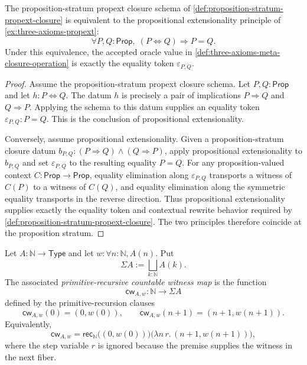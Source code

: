 \begin{theorem}
\label{thm:propext-proposition-stratum-meta-closure}
The proposition-stratum propext closure schema of \autoref{def:proposition-stratum-propext-closure} is equivalent to the propositional extensionality principle of \autoref{ex:three-axioms-propext}:
$$
\forall P,Q:\mathsf{Prop},\; (P\Leftrightarrow Q)\Rightarrow P=Q.
$$
Under this equivalence, the accepted oracle value in \autoref{def:three-axioms-meta-closure-operation} is exactly the equality token $\varepsilon_{P,Q}$.
\end{theorem}

\begin{proof}
Assume the proposition-stratum propext closure schema. Let $P,Q:\mathsf{Prop}$ and let $h:P\Leftrightarrow Q$. The datum $h$ is precisely a pair of implications $P\Rightarrow Q$ and $Q\Rightarrow P$. Applying the schema to this datum supplies an equality token $\varepsilon_{P,Q}:P=Q$. This is the conclusion of propositional extensionality.

Conversely, assume propositional extensionality. Given a proposition-stratum closure datum $b_{P,Q}:(P\Rightarrow Q)\land(Q\Rightarrow P)$, apply propositional extensionality to $b_{P,Q}$ and set $\varepsilon_{P,Q}$ to the resulting equality $P=Q$. For any proposition-valued context $C:\mathsf{Prop}\to\mathsf{Prop}$, equality elimination along $\varepsilon_{P,Q}$ transports a witness of $C(P)$ to a witness of $C(Q)$, and equality elimination along the symmetric equality transports in the reverse direction. Thus propositional extensionality supplies exactly the equality token and contextual rewrite behavior required by \autoref{def:proposition-stratum-propext-closure}. The two principles therefore coincide at the proposition stratum.
\end{proof}

\begin{definition}
\label{def:countable-choice-primitive-recursive-witness-map}
Let $A:\mathbb{N}\to\mathsf{Type}$ and let $w:\forall n:\mathbb{N},A(n)$. Put
$$
\Sigma A:=\bigsqcup_{k:\mathbb{N}}A(k).
$$
The associated \emph{primitive-recursive countable witness map} is the function
$$
\mathsf{cw}_{A,w}:\mathbb{N}\to\Sigma A
$$
defined by the primitive-recursion clauses
$$
\mathsf{cw}_{A,w}(0)=(0,w(0)),\qquad
\mathsf{cw}_{A,w}(n+1)=(n+1,w(n+1)).
$$
Equivalently,
$$
\mathsf{cw}_{A,w}
=
\mathsf{rec}_{\mathbb{N}}
\bigl((0,w(0))\bigr)
\bigl(\lambda n\,r.\,(n+1,w(n+1))\bigr),
$$
where the step variable $r$ is ignored because the premise supplies the witness in the next fiber.
\end{definition}

